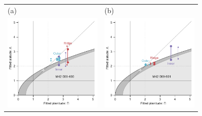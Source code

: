 \begin{figure}
  \begin{tabular}{p{0.45\linewidth} p{0.45\linewidth}}
    (a) & (b) \\
    \includegraphics[width=\linewidth]{figs/000-400-planitude-alatude}
    & \includegraphics[width=\linewidth]{figs/069-601-planitude-alatude}

\end{tabular}
\end{figure}
